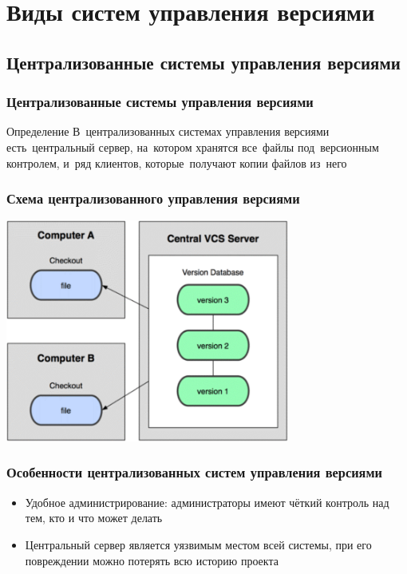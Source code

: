 \documentclass{../industrial-development}
\begin{document}
\section{Виды систем управления версиями}

\subsection{Централизованные системы управления версиями}

\begin{frame} \frametitle{Централизованные системы управления версиями}
  \begin{block}{Определение}
    В~\alert{централизованных системах управления версиями} есть~центральный сервер, на~котором хранятся все~файлы под~версионным контролем, и~ряд клиентов, которые~получают копии файлов 
из~него
  \end{block}
 
\end{frame}

\begin{frame} \frametitle{Схема централизованного управления версиями}
  \centerline{\includegraphics[width=0.7\textwidth]{centralizedVCS.pdf}}
\end{frame}

\begin{frame} \frametitle{Особенности централизованных систем управления версиями}
  \begin{itemize}
  \item Удобное администрирование: администраторы имеют чёткий контроль над тем, кто и что может делать
  \item Центральный сервер является уязвимым местом всей системы, при его повреждении можно потерять всю историю проекта
  \end{itemize}
\end{frame}
\end{document}
